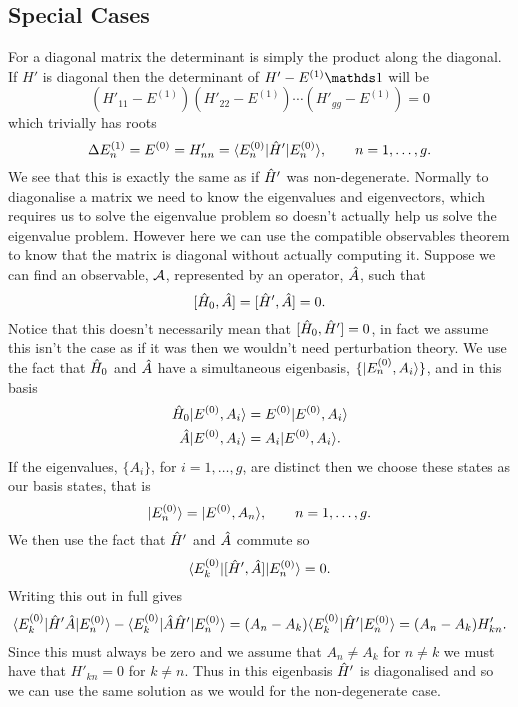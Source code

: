     \subsection{Special Cases}
    For a diagonal matrix the determinant is simply the product along the diagonal.
    If \(H'\) is diagonal then the determinant of \(H' - E^{(1)}\ident\) will be
    \[(H'_{11} - E^{(1)})(H'_{22} - E^{(1)})\dotsm(H'_{gg} - E^{(1)}) = 0\]
    which trivially has roots
    \[\Delta E_n^{(1)} = E^{(0)} = H'_{nn} = \langle {E_n^{(0)}} \vert\hat{H}'\vert {E_n^{(0)}} \rangle, \qquad n = 1, \dotsc, g.\]
    We see that this is exactly the same as if \(\hat{H}'\) was non-degenerate.
    Normally to diagonalise a matrix we need to know the eigenvalues and eigenvectors, which requires us to solve the eigenvalue problem so doesn't actually help us solve the eigenvalue problem.
    However here we can use the compatible observables theorem to know that the matrix is diagonal without actually computing it.
    Suppose we can find an observable, \(\mathcal{A}\), represented by an operator, \(\hat{A}\), such that
    \[[\hat{H}_0, \hat{A}] = [\hat{H}', \hat{A}] = 0.\]
    Notice that this doesn't necessarily mean that \([\hat{H}_0, \hat{H}'] = 0\), in fact we assume this isn't the case as if it was then we wouldn't need perturbation theory.
    We use the fact that \(\hat{H}_0\) and \(\hat{A}\) have a simultaneous eigenbasis, \(\{\vert {E_n^{(0)}, A_i} \rangle\}\), and in this basis
    \begin{align*}
        \hat{H}_0\vert {E^{(0)}, A_i} \rangle &= E^{(0)}\vert {E^{(0)}, A_i} \rangle\\
        \hat{A} \vert {E^{(0)}, A_i} \rangle &= A_i \vert {E^{(0)}, A_i} \rangle.
    \end{align*}
    If the eigenvalues, \(\{A_i\}\), for \(i = 1, \dotsc, g\), are distinct then we choose these states as our basis states, that is
    \[\vert {E_n^{(0)}} \rangle = \vert {E^{(0)}, A_n} \rangle, \qquad n = 1, \dotsc, g.\]
    We then use the fact that \(\hat{H}'\) and \(\hat{A}\) commute so
    \[\langle {E_k^{(0)}} \vert[\hat{H}', \hat{A}]\vert {E_n^{(0)}} \rangle = 0.\]
    Writing this out in full gives
    \[\langle {E_k^{(0)}} \vert\hat{H}'\hat{A}\vert {E_n^{(0)}} \rangle - \langle {E_k^{(0)}} \vert\hat{A}\hat{H}'\vert {E_n^{(0)}} \rangle = (A_n - A_k)\langle {E_k^{(0)}} \vert\hat{H}'\vert {E_n^{(0)}} \rangle = (A_n - A_k)H'_{kn}.\]
    Since this must always be zero and we assume that \(A_n \ne A_k\) for \(n \ne k\) we must have that \(H'_{kn} = 0\) for \(k \ne n\).
    Thus in this eigenbasis \(\hat{H}'\) is diagonalised and so we can use the same solution as we would for the non-degenerate case.
    
